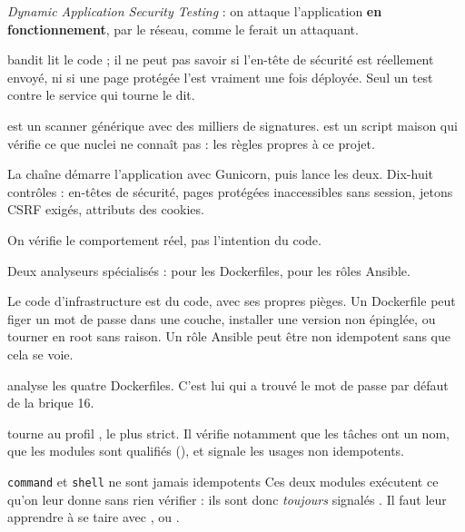 
\quoi
\emph{Dynamic Application Security Testing} : on attaque l'application
\textbf{en fonctionnement}, par le réseau, comme le ferait un attaquant.

\pourquoi
bandit lit le code ; il ne peut pas savoir si l'en-tête de sécurité est
réellement envoyé, ni si une page protégée l'est vraiment une fois déployée.
Seul un test contre le service qui tourne le dit.

 est un scanner générique avec des milliers de signatures.
 est un script maison qui vérifie ce que nuclei ne
connaît pas : les règles propres à ce projet.

\role
La chaîne démarre l'application avec Gunicorn, puis lance les deux. Dix-huit
contrôles : en-têtes de sécurité, pages protégées inaccessibles sans session,
jetons CSRF exigés, attributs des cookies.

\apport
On vérifie le comportement réel, pas l'intention du code.


\quoi
Deux analyseurs spécialisés :  pour les Dockerfiles,
 pour les rôles Ansible.

\pourquoi
Le code d'infrastructure est du code, avec ses propres pièges. Un Dockerfile
peut figer un mot de passe dans une couche, installer une version non épinglée,
ou tourner en root sans raison. Un rôle Ansible peut être non idempotent sans
que cela se voie.

\role
{} analyse les quatre Dockerfiles. C'est lui qui a trouvé le mot de
passe par défaut de la brique 16.

 tourne au profil , le plus strict. Il vérifie
notamment que les tâches ont un nom, que les modules sont qualifiés
(), et signale les usages non idempotents.

\begin{piege}{\texttt{command} et \texttt{shell} ne sont jamais idempotents}
Ces deux modules exécutent ce qu'on leur donne sans rien vérifier : ils sont
donc \emph{toujours} signalés . Il faut leur apprendre à se taire
avec ,  ou .
\end{piege}

